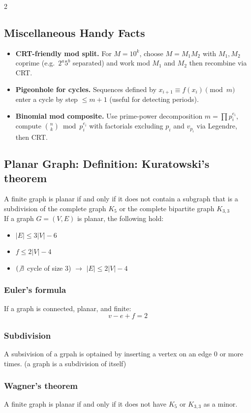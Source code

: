 \documentclass[10pt]{article}
\theoremstyle{definition}
\begin{document}
\begin{multicols*}{2}
\subsection{Miscellaneous Handy Facts}
\begin{itemize}
  \item \textbf{CRT-friendly mod split.} For $M=10^k$, choose $M=M_1M_2$ with $M_1,M_2$ coprime (e.g.\ $2^a5^b$ separated) and work mod $M_1$ and $M_2$ then recombine via CRT.
  \item \textbf{Pigeonhole for cycles.} Sequences defined by $x_{i+1}\equiv f(x_i)\pmod m$ enter a cycle by step $\le m+1$ (useful for detecting periods).
  \item \textbf{Binomial mod composite.} Use prime-power decomposition $m=\prod p_i^{e_i}$, compute $\binom{n}{k}\bmod p_i^{e_i}$ with factorials excluding $p_i$ and $v_{p_i}$ via Legendre, then CRT.
\end{itemize}


\subsection{Planar Graph: Definition: Kuratowski's theorem}
A finite graph is planar if and only if it does not contain a subgraph that is a subdivision of the complete graph $K_5$ or the complete bipartite graph $K_{3, 3}$\\
If a graph $G = (V, E)$ is planar, the following hold:
\begin{itemize}
  \item $|E| \leq 3|V| - 6$
  \item $f \leq 2 |V| - 4$
  \item $(\not\exists$ cycle of size 3) $\rightarrow$ $|E| \leq 2|V| -4 $
\end{itemize}
\subsubsection*{Euler's formula}
If a graph is connected, planar, and finite:
\[v - e + f = 2\]
\subsubsection*{Subdivision}
A subsivision of a grpah is optained by inserting a vertex on an edge 0 or more times. (a graph is a subdivision of itself)
\subsubsection*{Wagner's theorem}
A finite graph is planar if and only if it does not have $K_5$ or $K_{3,3}$ as a minor.

\end{multicols*}
\end{document}
